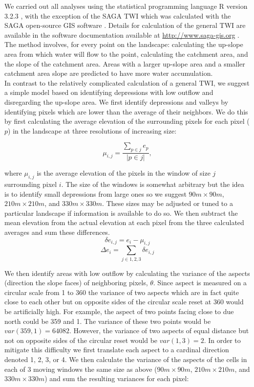\documentclass[10pt,letterpaper]{article}\usepackage[]{graphicx}\usepackage[]{color}
\begin{document}
We carried out all analyses using the statistical programming language R version 3.2.3 \cite{RCoreTeam2015}, with the exception of the SAGA TWI which was calculated with the SAGA open-source GIS software \cite{Bohner2006}.  Details for calculation of the general TWI are available in the software documentation available at \href{http://www.saga-gis.org/saga_module_doc/2.1.4/ta_hydrology.html}{http://www.saga-gis.org} \cite{Conrad2015}.  The method involves, for every point on the landscape:  calculating the up-slope area from which water will flow to the point,  calculating the catchment area, and the slope of the catchment area.  Areas with a larger up-slope area and a smaller catchment area slope are predicted to have more water accumulation.\\

In contrast to the relatively complicated calculation of a general TWI, we suggest a simple model based on identifying depressions with low outflow and disregarding the up-slope area.  We first identify depressions and valleys by identifying pixels which are lower than the average of their neighbors.  We do this by first calculating the average elevation of the surrounding pixels for each pixel ($p$) in the landscape at three resolutions of increasing size:  

$$\mu_{i,j} = \frac{\sum_{p \in j}e_p}{|p \in j|},$$

where $\mu_{i,j}$ is the average elevation of the pixels in the window of size $j$ surrounding pixel $i$.  The size of the windows is somewhat arbitrary but the idea is to identify small depressions from large ones so we suggest $90m \times 90m$, $210m \times 210m$, and $330m \times 330m$.  These sizes may be adjusted or tuned to a particular landscape if information is available to do so.  We then subtract the mean elevation from the actual elevation at each pixel from the three calculated averages and sum these differences.\\

$$\delta e_{i,j} = e_i - \mu_{i,j} $$
$$\Delta e_{i} = \sum_{j \in 1,2,3} \delta e_{i,j}$$

We then identify areas with low outflow by calculating the variance of the aspects (direction the slope faces) of neighboring pixels, $\theta$.  Since aspect is measured on a circular scale from 1 to 360 the variance of two aspects which are in fact quite close to each other but on opposite sides of the circular scale reset at 360 would be artificially high.  For example, the aspect of two points facing close to due north could be 359 and 1.  The variance of these two points would be $var(359,1)= 64082$.  However, the variance of two aspects of equal distance but not on opposite sides of the circular reset would be $var(1,3) = 2$.  In order to mitigate this difficulty we first translate each aspect to a cardinal direction denoted 1, 2, 3, or 4. We then calculate the variance of the aspects of the cells in each of 3 moving windows the same size as above ($90m \times 90m$, $210m \times 210m$, and $330m \times 330m$) and sum the resulting variances for each pixel:
\end{document}
